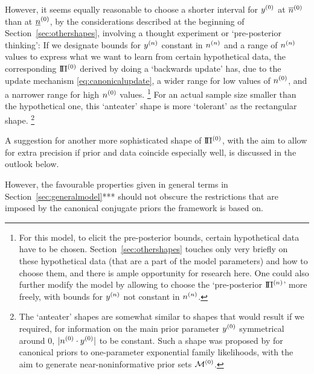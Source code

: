 However, it seems equally reasonable to choose %
a shorter interval for $y^{(0)}$ at $\overline{n}^{(0)}$ than at $\underline{n}^{(0)}$,
by the considerations described at the beginning of Section~\ref{sec:othershapes},
involving a thought experiment or `pre-posterior thinking':
If we designate bounds for $y^{(n)}$ constant in $n^{(n)}$ and a range of $n^{(n)}$ values
to express what we want to learn from certain hypothetical data,
the corresponding $\text{I}\!\Pi^{(0)}$ derived by doing a `backwards update' has,
due to the update mechanism \eqref{eq:canonicalupdate},
a wider range for low values of $n^{(0)}$, and a narrower range for high $n^{(0)}$ values.%
\footnote{For this model, to elicit the pre-posterior bounds, certain hypothetical data have to be chosen.
Section~\ref{sec:othershapes} touches only very briefly on these hypothetical data
(that are a part of the model parameters) and how to choose them,
and there is ample opportunity for research here.
One could also further modify the model by allowing to choose
the `pre-posterior $\text{I}\!\Pi^{(n)}$' more freely, with bounds for $y^{(n)}$ not constant in $n^{(n)}$.}
For an actual sample size smaller than the hypothetical one,
this `anteater' shape is more `tolerant' as the rectangular shape.%
\footnote{The `anteater' shapes are somewhat similar to shapes that would result
if we required, for information on the main prior parameter $y^{(0)}$ symmetrical around $0$,
$|n^{(0)} \cdot y^{(0)}|$ to be constant.
Such a shape was proposed by \textcite{2012:benavolizaffalon}
for canonical priors to one-parameter exponential family likelihoods,
with the aim to generate near-noninformative prior sets $\mathcal{M}^{(0)}$.}

A suggestion for another more sophisticated shape of $\text{I}\!\Pi^{(0)}$,
with the aim to allow for extra precision if prior and data coincide especially well,
is discussed in the outlook below.

However, the favourable properties given in general terms in Section~\ref{sec:generalmodel}***
should not obscure the restrictions that are imposed by the canonical conjugate priors
the framework is based on. 

